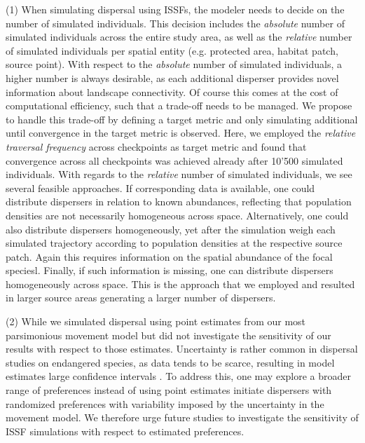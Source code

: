 \documentclass[abstract=on,10pt,a4paper,bibliography=totocnumbered]{article}
\begin{document}
(1) When simulating dispersal using ISSFs, the modeler needs to decide on the
number of simulated individuals. This decision includes the \textit{absolute}
number of simulated individuals across the entire study area, as well as the
\textit{relative} number of simulated individuals per spatial entity (e.g.
protected area, habitat patch, source point). With respect to the
\textit{absolute} number of simulated individuals, a higher number is always
desirable, as each additional disperser provides novel information about
landscape connectivity. Of course this comes at the cost of computational
efficiency, such that a trade-off needs to be managed. We propose to handle this
trade-off by defining a target metric and only simulating additional until
convergence in the target metric is observed. Here, we employed the
\textit{relative traversal frequency} across checkpoints as target metric and
found that convergence across all checkpoints was achieved already after 10'500
simulated individuals. With regards to the \textit{relative} number of simulated
individuals, we see several feasible approaches. If corresponding data is
available, one could distribute dispersers in relation to known abundances,
reflecting that population densities are not necessarily homogeneous across
space. Alternatively, one could also distribute dispersers homogeneously, yet
after the simulation weigh each simulated trajectory according to population
densities at the respective source patch. Again this requires information on the
spatial abundance of the focal speciesl. Finally, if such information is
missing, one can distribute dispersers homogeneously across space. This is the
approach that we employed and resulted in larger source areas generating a
larger number of dispersers.

(2) While we simulated dispersal using point estimates from our most
parsimonious movement model but did not investigate the sensitivity of our
results with respect to those estimates. Uncertainty is rather common in
dispersal studies on endangered species, as data tends to be scarce, resulting
in model estimates large confidence intervals \citep{Wiegand.2003,
KramerSchadt.2007}. To address this, one may explore a broader range of
preferences instead of using point estimates initiate dispersers with randomized
preferences with variability imposed by the uncertainty in the movement model.
We therefore urge future studies to investigate the sensitivity of ISSF
simulations with respect to estimated preferences.
\end{document}
